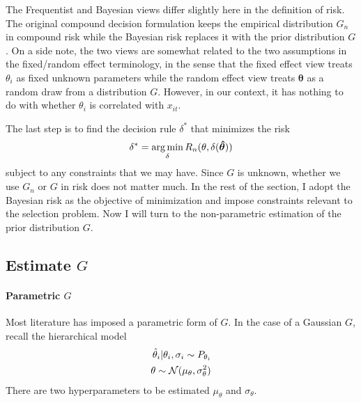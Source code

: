 \documentclass[12pt]{article}
\begin{document}
The Frequentist and Bayesian views differ slightly here in the definition of
risk. The original compound decision formulation keeps the empirical
distribution $G_n$ in compound risk while the Bayesian risk replaces it with
the prior distribution $G$. On a side note, the two views are somewhat related
to the two assumptions in the fixed/random effect terminology, in the sense
that the fixed effect view treats $\theta_i$ as fixed unknown parameters while
the random effect view treats $\boldsymbol{\theta}$ as a random draw from a
distribution $G$. However, in our context, it has nothing to do with whether
$\theta_i$ is correlated with $x_{it}$.

The last step is to find the decision rule $\delta^*$ that minimizes the risk
\begin{equation}
    \delta^*=\operatorname*{arg\,min}_\delta R_n(\theta, \delta(\boldsymbol{\hat{\theta}}))
\end{equation}
subject to any constraints that we may have. Since $G$ is unknown, whether we use $G_n$ or $G$ in risk does not matter much. In the rest of the section, I adopt the Bayesian risk as the objective of minimization and impose constraints relevant to the selection problem. Now I will turn to the non-parametric estimation of the prior distribution $G$.

\subsection{Estimate $G$}

\paragraph{Parametric $G$}
Most literature has imposed a parametric form of $G$. In the case of a Gaussian
$G$, recall the hierarchical model
\begin{align*}
    \hat{\theta}_i|\theta_i, \sigma_i \sim P_{\theta_i} \\
    \theta\sim \mathcal{N}(\mu_\theta,\sigma^2_\theta)
\end{align*}
There are two hyperparameters to be estimated $\mu_\theta$ and $\sigma_\theta$.
\end{document}
